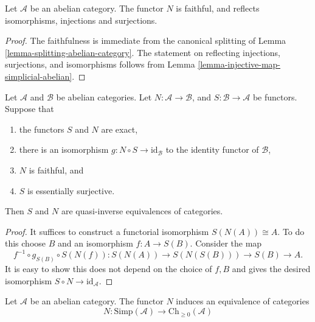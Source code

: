 \begin{lemma}
\label{lemma-N-faithful}
Let $\mathcal{A}$ be an abelian category.
The functor $N$ is faithful, and reflects
isomorphisms, injections and surjections.
\end{lemma}

\begin{proof}
The faithfulness is immediate from the canonical
splitting of Lemma \ref{lemma-splitting-abelian-category}.
The statement on reflecting injections, surjections, and
isomorphisms follows from
Lemma \ref{lemma-injective-map-simplicial-abelian}.
\end{proof}

\begin{lemma}
\label{lemma-S-N}
Let $\mathcal{A}$ and $\mathcal{B}$ be abelian categories.
Let $N : \mathcal{A} \to \mathcal{B}$, and
$S : \mathcal{B} \to \mathcal{A}$ be functors.
Suppose that
\begin{enumerate}
\item the functors $S$ and $N$ are exact,
\item there is an isomorphism $g : N \circ S \to \text{id}_\mathcal{B}$
to the identity functor of $\mathcal{B}$,
\item $N$ is faithful, and
\item $S$ is essentially surjective.
\end{enumerate}
Then $S$ and $N$ are quasi-inverse equivalences of categories.
\end{lemma}

\begin{proof}
It suffices to construct a functorial
isomorphism $S(N(A)) \cong A$. To do this
choose $B$ and an isomorphism $f : A  \to S(B)$.
Consider the map
$$
f^{-1} \circ g_{S(B)} \circ S(N(f)) :
S(N(A)) \to S(N(S(B))) \to S(B) \to A.
$$
It is easy to show this does not depend on
the choice of $f, B$ and gives the desired
isomorphism $S \circ N \to \text{id}_\mathcal{A}$.
\end{proof}

\begin{theorem}
\label{theorem-dold-kan}
Let $\mathcal{A}$ be an abelian category.
The functor $N$ induces an equivalence of
categories
$$
N :
\text{Simp}(\mathcal{A})
\longrightarrow
\text{Ch}_{\geq 0}(\mathcal{A})
$$
\end{theorem}

